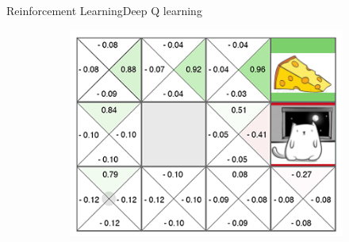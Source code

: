 \documentclass[10pt]{beamer}
\begin{document}
\begin{frame}{Reinforcement Learning}{Deep Q learning}
\begin{figure}[!htb]
\centering
\begin{subfigure}[t]{0.5\linewidth}
\includegraphics[width=1.3\textwidth]{assets/grid.png}
\end{subfigure}
\vspace{0.1in}
\label{fig:tripEmb}
\end{figure}
\end{frame}

\end{document}
